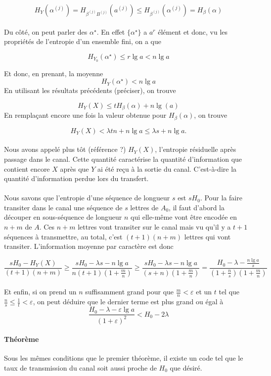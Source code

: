 	\[
		H_Y(\alpha^{(j)}) = H_{\beta^{(j)}B^{(j)}}\left(a^{(j)}\right) \le 
		H_{\beta^{(j)}}\left(\alpha^{(j)}\right)=H_\beta(\alpha)
	\]
	
	\paragraph{}
	Du côté, on peut parler des $\alpha^\star$. En effet $\{\alpha^\star\}$ a 
	$a^r$ élément et donc, vu les propriétés de l'entropie d'un ensemble fini,
	on a que
	
	\[H_{Y_0}(\alpha^\star) \le r\lg a < n\lg a\]
	
	Et donc, en prenant, la moyenne 
	\[H_Y(\alpha^\star) < n \lg a\]
	En utilisant les résultats précédents (préciser), on trouve
	
	\[H_Y(X)\le t H_\beta(\alpha) + n \lg(a)\]
	En remplaçant encore une fois la valeur obtenue pour $H_\beta(\alpha)$, 
	on trouve
	
	\[H_Y(X)<\lambda t n + n \lg a \le \lambda s+n \lg a.\]
	
	\paragraph{}
	Nous avons appelé plus tôt (référence ?) $H_Y(X)$, l'entropie résiduelle 
	après passage dans le canal. Cette quantité caractérise la quantité 
	d'information que contient encore $X$ après que $Y$ ai été reçu à la 
	sortie du canal. C'est-à-dire la quantité d'information perdue lors 
	du transfert.
	
	\paragraph{}
	Nous savons que l'entropie d'une séquence de longueur $s$ est $sH_0$. 
	Pour la faire transiter dans le canal une séquence de $s$ lettres de $A_0$,
	il faut d'abord la découper en sous-séquence de longueur $n$ qui elle-même 
	vont être encodée en $n+m$ de $A$. Ces $n+m$ lettres vont transiter sur le 
	canal mais vu qu'il y a $t+1$ séquences à transmettre, au total, c'est 
	$(t+1)(n+m)$ lettres qui vont transiter. L'information moyenne par 
	caractère est donc
	
	\[
		\frac{sH_0-H_Y(X)}{(t+1)(n+m)} \ge 
		\frac{sH_0-\lambda s-n\lg a}{n(t+1)(1+\frac{m}{n})} \ge 
		\frac{sH_0-\lambda s-n\lg a}{(s+n)(1+\frac{m}{n})} = 
		\frac{H_0-\lambda-\frac{n\lg a}{s}}{(1+\frac{n}{s})(1+\frac{m}{n})}
	\]
	
	\paragraph{}
	Et enfin, si on prend un $n$ suffisamment grand pour que 
	$\frac{m}{n}<\varepsilon$ et un $t$ tel que
	$\frac{n}{s} \le \frac{1}{t} < \varepsilon$, on peut 
	déduire que le dernier terme est plus grand ou égal à
	\[\frac{H_0-\lambda-\varepsilon\lg a}{(1+\varepsilon)^2}<H_0-2\lambda\]
	
	
	
	
	
	
	
	
	\paragraph{Théorème}
	Sous les mêmes conditions que le premier théorème, il existe un code tel
	que le taux de transmission du canal soit aussi proche de $H_0$ que désiré.

